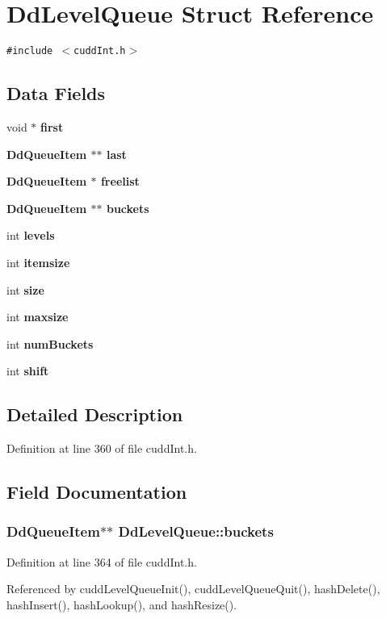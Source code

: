 \section{Dd\-Level\-Queue Struct Reference}
\label{structDdLevelQueue}
{\tt \#include $<$cudd\-Int.h$>$}

\subsection*{Data Fields}
\begin{CompactItemize}
\item 
void $\ast$ \bf{first}
\item 
\bf{Dd\-Queue\-Item} $\ast$$\ast$ \bf{last}
\item 
\bf{Dd\-Queue\-Item} $\ast$ \bf{freelist}
\item 
\bf{Dd\-Queue\-Item} $\ast$$\ast$ \bf{buckets}
\item 
int \bf{levels}
\item 
int \bf{itemsize}
\item 
int \bf{size}
\item 
int \bf{maxsize}
\item 
int \bf{num\-Buckets}
\item 
int \bf{shift}
\end{CompactItemize}


\subsection{Detailed Description}




Definition at line 360 of file cudd\-Int.h.

\subsection{Field Documentation}
\subsubsection{\setlength{\rightskip}{0pt plus 5cm}\bf{Dd\-Queue\-Item}$\ast$$\ast$ \bf{Dd\-Level\-Queue::buckets}}\label{structDdLevelQueue_10750bfd3e96d25ce4d69eb476b64e9f}




Definition at line 364 of file cudd\-Int.h.

Referenced by cudd\-Level\-Queue\-Init(), cudd\-Level\-Queue\-Quit(), hash\-Delete(), hash\-Insert(), hash\-Lookup(), and hash\-Resize().
